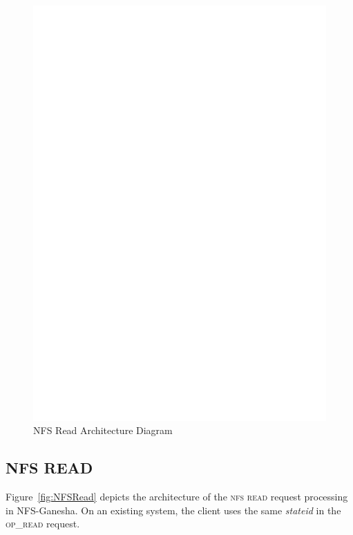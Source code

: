 \begin{figure}
\centering
\includegraphics[scale=0.7]{figures/Read.eps}
\caption{NFS Read Architecture Diagram}
\label{fig:NFSReadArch}
\end{figure}

\subsection{NFS READ}

Figure~\ref{fig:NFSRead} depicts the architecture of the \textsc{nfs read} request processing in NFS-Ganesha. On an existing system, the client uses the same \textit{stateid} in the \textsc{op\_read} request. 

